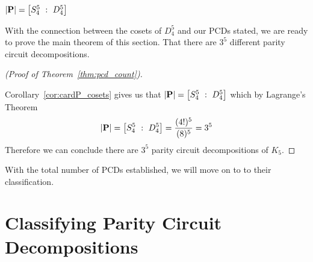 \begin{corollary}
  \label{cor:cardP_cosets}
   $\card{\pcdSet} = \left[ S_{4}^5 \ : \ D_{4}^{5}\right]$
\end{corollary}

\noindent

\noindent
With the connection between the cosets of $D_{4}^5$ and our PCDs stated, we are ready to prove the main theorem of this section. That there are $3^5$ different parity circuit decompositions.


\begin{proof}[(Proof of  Theorem~\ref{thm:pcd_count})]
  \label{pf:pcd_count}

Corollary~\ref{cor:cardP_cosets} gives us that $\card{\pcdSet} = \left[ S_{4}^5 \ : \ D_{4}^{5}\right]$ which by Lagrange's Theorem  \[  \card{\pcdSet} = \left[ S_{4}^5 \ : \ D_{4}^{5}\right] = \frac{(4!)^5}{(8)^5} = 3^5  \] Therefore we can conclude there are $3^5$ parity circuit decompositions of $K_5$. 
\end{proof}

\noindent
With the total number of PCDs established, we will move on to to their classification. 


\section{Classifying Parity Circuit Decompositions}
\label{sec:class-parity-circ}

